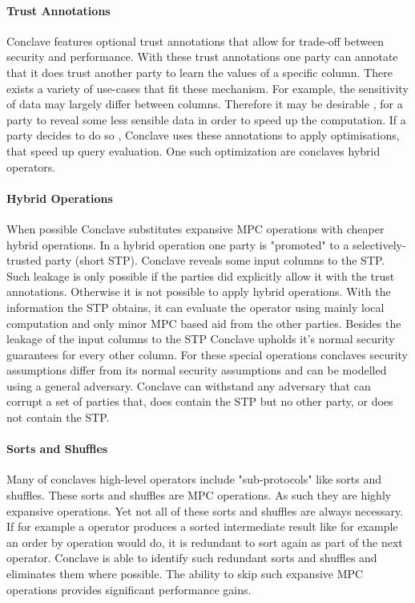 \paragraph{Trust Annotations}
Conclave features optional trust annotations that allow for trade-off between security and performance. With these trust annotations one party can annotate that it does trust another party to learn the values of a specific column. There exists a variety of use-cases that fit these mechanism. For example, the sensitivity of data may largely differ between columns. Therefore it may be desirable , for a party to reveal some less sensible data in order to speed up the computation. If a party decides to do so , Conclave uses these annotations to apply optimisations, that speed up query evaluation. One such optimization are conclaves hybrid operators.
\paragraph{Hybrid Operations}
When possible Conclave substitutes expansive MPC operations with cheaper hybrid operations. In a hybrid operation one party is "promoted" to a selectively-trusted party (short STP). Conclave reveals some input columns to the STP. Such leakage is only possible if the parties did explicitly allow it with the trust annotations. Otherwise it is not possible to apply hybrid operations. With the information the STP obtains, it can evaluate the operator using mainly local computation and only minor MPC based aid from the other parties. Besides the leakage of the input columns to the STP Conclave upholds it's normal security guarantees for every other column. For these special operations conclaves security assumptions differ from its normal security assumptions and can be modelled using a general adversary. Conclave can withstand any adversary that can corrupt a set of parties that, does contain the STP but no other party, or does not contain the STP. 
\paragraph{Sorts and Shuffles}
Many of conclaves high-level operators include "sub-protocols" like sorts and shuffles. These sorts and shuffles are MPC operations. As such they are highly expansive operations. Yet not all of these sorts and shuffles are always necessary. If for example a operator produces a sorted intermediate result like for example an order by operation would do, it is redundant to sort again as part of the next operator. Conclave is able to identify such redundant sorts and shuffles and eliminates them where possible. The ability to skip such expansive MPC operations provides significant performance gains.




